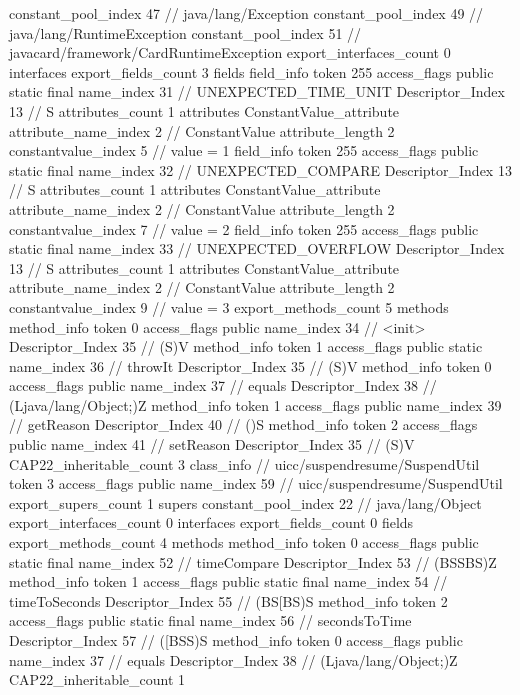 {{{{				constant_pool_index	47		// java/lang/Exception
				constant_pool_index	49		// java/lang/RuntimeException
				constant_pool_index	51		// javacard/framework/CardRuntimeException
			}
			export_interfaces_count	0
			interfaces {
			}
			export_fields_count	3
			fields {
			field_info {
				token	255
				access_flags	public static final
				name_index	31		// UNEXPECTED_TIME_UNIT
				Descriptor_Index	13		// S
				attributes_count	1
				attributes {
				ConstantValue_attribute {
					attribute_name_index	2		// ConstantValue
					attribute_length	2
					constantvalue_index	5		// value = 1
				}
				}
			}
			field_info {
				token	255
				access_flags	public static final
				name_index	32		// UNEXPECTED_COMPARE
				Descriptor_Index	13		// S
				attributes_count	1
				attributes {
				ConstantValue_attribute {
					attribute_name_index	2		// ConstantValue
					attribute_length	2
					constantvalue_index	7		// value = 2
				}
				}
			}
			field_info {
				token	255
				access_flags	public static final
				name_index	33		// UNEXPECTED_OVERFLOW
				Descriptor_Index	13		// S
				attributes_count	1
				attributes {
				ConstantValue_attribute {
					attribute_name_index	2		// ConstantValue
					attribute_length	2
					constantvalue_index	9		// value = 3
				}
				}
			}
			}
			export_methods_count	5
			methods {
				method_info {
					token	0
					access_flags	public
					name_index	34		// <init>
					Descriptor_Index	35		// (S)V
				}
				method_info {
					token	1
					access_flags	public static
					name_index	36		// throwIt
					Descriptor_Index	35		// (S)V
				}
				method_info {
					token	0
					access_flags	public
					name_index	37		// equals
					Descriptor_Index	38		// (Ljava/lang/Object;)Z
				}
				method_info {
					token	1
					access_flags	public
					name_index	39		// getReason
					Descriptor_Index	40		// ()S
				}
				method_info {
					token	2
					access_flags	public
					name_index	41		// setReason
					Descriptor_Index	35		// (S)V
				}
			}
			CAP22_inheritable_count	3
		}
		class_info {		// uicc/suspendresume/SuspendUtil
			token	3
			access_flags	public
			name_index	59		// uicc/suspendresume/SuspendUtil
			export_supers_count	1
			supers {
				constant_pool_index	22		// java/lang/Object
			}
			export_interfaces_count	0
			interfaces {
			}
			export_fields_count	0
			fields {
			}
			export_methods_count	4
			methods {
				method_info {
					token	0
					access_flags	public static final
					name_index	52		// timeCompare
					Descriptor_Index	53		// (BSSBS)Z
				}
				method_info {
					token	1
					access_flags	public static final
					name_index	54		// timeToSeconds
					Descriptor_Index	55		// (BS[BS)S
				}
				method_info {
					token	2
					access_flags	public static final
					name_index	56		// secondsToTime
					Descriptor_Index	57		// ([BSS)S
				}
				method_info {
					token	0
					access_flags	public
					name_index	37		// equals
					Descriptor_Index	38		// (Ljava/lang/Object;)Z
				}
			}
			CAP22_inheritable_count	1
		}
	}
}
